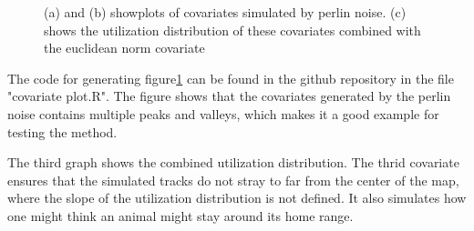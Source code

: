 \begin{figure}[H]%
    \centering
    \qquad
    \qquad
    \caption[covariate and utilization distribution plots]{(a) and (b) showplots of covariates simulated by perlin noise. (c) shows the utilization distribution of these covariates combined with the euclidean norm covariate}%
    \label{fig:covariate plots}%
\end{figure}


The code for generating figure\ref{fig:covariate plots} can be found in the github repository in the file "covariate plot.R". The figure shows that the covariates generated by the perlin noise contains multiple peaks and valleys, which makes it a good example for testing the method.

The third graph shows the combined utilization distribution. The thrid covariate ensures that the simulated tracks do not stray to far from the center of the map, where the slope of the utilization distribution is not defined. It also simulates how one might think an animal might stay around its home range. 


